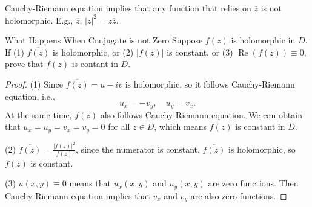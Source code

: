 \begin{note}
  Cauchy-Riemann equation implies that any function that relies on
  $\overline{z}$ is not holomorphic.
  E.g., $\overline{z}$, $|z|^2 = z\overline{z}$.
\end{note}

\begin{example}{What Happens When Conjugate is not Zero}{}
  Suppose $f(z)$ is holomorphic in $D$.
  If (1) $\overline{f(z)}$ is holomorphic,
  or (2) $|f(z)|$ is constant,
  or (3) $\operatorname{Re}(f(z)) \equiv 0$,
  prove that $f(z)$ is contant in $D$.
\end{example}

\begin{proof}
  (1) Since $\overline{f(z)} = u - iv$ is holomorphic, so it follows Cauchy-Riemann equation, i.e.,
  \begin{equation}
    u_x = -v_y, \quad u_y = v_x.
  \end{equation}
  At the same time, $f(z)$ also follows Cauchy-Riemann equation.
  We can obtain that $u_x = u_y = v_x = v_y = 0$ for all $z \in D$,
  which means $f(z)$ is constant in $D$.

  (2) $\overline{f(z)} = \frac{|f(z)|^2}{f(z)}$, since the numerator is constant,
  $\overline{f(z)}$ is holomorphic, so $f(z)$ is constant.

  (3) $u(x,y) \equiv 0$ means that $u_x(x,y)$ and $u_y(x,y)$ are zero functions.
  Then Cauchy-Riemann equation implies that $v_x$ and $v_y$ are also zero functions.
\end{proof}



